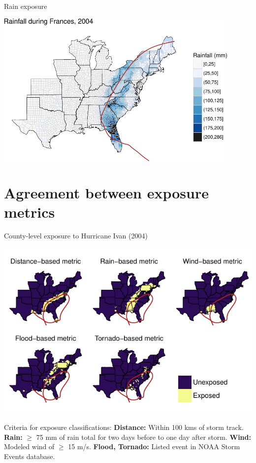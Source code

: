 \documentclass[ignorenonframetext,]{beamer}
\begin{document}
\begin{frame}{Rain exposure}

\begin{center}\includegraphics[width=0.9\textwidth]{anderson_apha_2017_files/figure-beamer/frances_rain_example-1} \end{center}

\end{frame}

\section{Agreement between exposure
metrics}\label{agreement-between-exposure-metrics}

\begin{frame}{County-level exposure to Hurricane Ivan (2004)}

\vspace{-0.6cm}

\begin{center}\includegraphics[height=0.75\textheight]{ivanexposurepresentation} \end{center}

\vspace{-0.5cm} \scriptsize Criteria for exposure classifications:
\textbf{Distance:} Within 100 kms of storm track. \textbf{Rain:} \(\ge\)
75 mm of rain total for two days before to one day after storm.
\textbf{Wind:} Modeled wind of \(\ge\) 15 m/s. \textbf{Flood, Tornado:}
Listed event in NOAA Storm Events database.

\end{frame}
\end{document}
